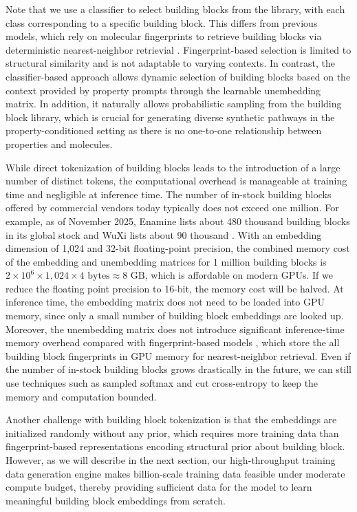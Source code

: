 Note that we use a classifier to select building blocks from the library, with each class corresponding to a specific building block.
This differs from previous models, which rely on molecular fingerprints to retrieve building blocks via deterministic nearest-neighbor retrievial \citep{luo2024projecting}.
Fingerprint-based selection is limited to structural similarity and is not adaptable to varying contexts.
In contrast, the classifier-based approach allows dynamic selection of building blocks based on the context provided by property prompts through the learnable unembedding matrix.
In addition, it naturally allows probabilistic sampling from the building block library, which is crucial for generating diverse synthetic pathways in the property-conditioned setting as there is no one-to-one relationship between properties and molecules.

While direct tokenization of building blocks leads to the introduction of a large number of distinct tokens, the computational overhead is manageable at training time and negligible at inference time.
The number of in-stock building blocks offered by commercial vendors today typically does not exceed one million.
For example, as of November 2025, Enamine lists about 480 thousand building blocks in its global stock \citep{enamineBuildingBlocks} and WuXi lists about 90 thousand \citep{wuxi}.
With an embedding dimension of 1,024 and 32-bit floating-point precision, the combined memory cost of the embedding and unembedding matrices for 1 million building blocks is $2 \times 10^{6} \times 1,024 \times 4 \text{ bytes} \approx 8 \text{ GB}$, which is affordable on modern GPUs.
If we reduce the floating point precision to 16-bit, the memory cost will be halved.
At inference time, the embedding matrix does not need to be loaded into GPU memory, since only a small number of building block embeddings are looked up.
Moreover, the unembedding matrix does not introduce significant inference-time memory overhead compared with fingerprint-based models \citep{luo2024projecting,gao2025generative}, which store the all building block fingerprints in GPU memory for nearest-neighbor retrieval.
Even if the number of in-stock building blocks grows drastically in the future, we can still use techniques such as sampled softmax \citep{blanc2018adaptive} and cut cross-entropy \citep{wijmans2024cut} to keep the memory and computation bounded.


Another challenge with building block tokenization is that the embeddings are initialized randomly without any prior, which requires more training data than fingerprint-based representations encoding structural prior about building block.
However, as we will describe in the next section, our high-throughput training data generation engine makes billion-scale training data feasible under moderate compute budget, thereby providing sufficient data for the model to learn meaningful building block embeddings from scratch.


